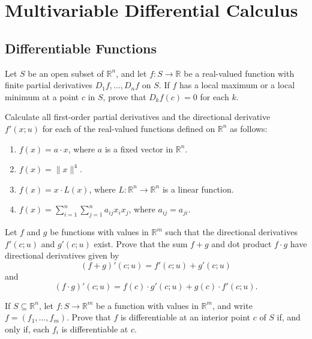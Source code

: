 \chapter{Multivariable Differential Calculus}

\section{Differentiable Functions}

\begin{problembox}
Let \( S \) be an open subset of \( \mathbb{R}^n \), and let \( f: S \to \mathbb{R} \) be a real-valued function with finite partial derivatives \( D_1f, \ldots, D_nf \) on \( S \). If \( f \) has a local maximum or a local minimum at a point \( c \) in \( S \), prove that \( D_kf(c) = 0 \) for each \( k \).
\end{problembox}

\begin{problembox}
Calculate all first-order partial derivatives and the directional derivative \( f'(x; u) \) for each of the real-valued functions defined on \( \mathbb{R}^n \) as follows:
\begin{enumerate}[label=(\alph*)]
\item \( f(x) = a \cdot x \), where \( a \) is a fixed vector in \( \mathbb{R}^n \).
\item \( f(x) = \|x\|^4 \).
\item \( f(x) = x \cdot L(x) \), where \( L : \mathbb{R}^n \to \mathbb{R}^n \) is a linear function.
\item \( f(x) = \sum_{i=1}^{n} \sum_{j=1}^{n} a_{ij}x_i x_j \), where \( a_{ij} = a_{ji} \).
\end{enumerate}
\end{problembox}

\begin{problembox}
Let \( f \) and \( g \) be functions with values in \( \mathbb{R}^m \) such that the directional derivatives \( f'(c; u) \) and \( g'(c; u) \) exist. Prove that the sum \( f + g \) and dot product \( f \cdot g \) have directional derivatives given by
\[(f + g)'(c; u) = f'(c; u) + g'(c; u)\]
and
\[(f \cdot g)'(c; u) = f(c) \cdot g'(c; u) + g(c) \cdot f'(c; u).\]
\end{problembox}

\begin{problembox}
If \( S \subseteq \mathbb{R}^n \), let \( f: S \to \mathbb{R}^m \) be a function with values in \( \mathbb{R}^m \), and write \( f = (f_1, \ldots, f_m) \). Prove that \( f \) is differentiable at an interior point \( c \) of \( S \) if, and only if, each \( f_i \) is differentiable at \( c \).
\end{problembox}

